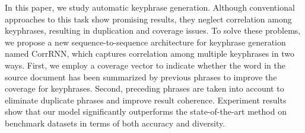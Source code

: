 In this paper, we study automatic keyphrase generation. Although conventional approaches to this task show promising results, they neglect correlation among keyphrases, resulting in duplication and coverage issues. To solve these problems, we propose a new sequence-to-sequence architecture for keyphrase generation named CorrRNN, which captures correlation among multiple keyphrases in two ways. First, we employ a coverage vector to indicate whether the word in the source document has been summarized by previous phrases to improve the coverage for keyphrases. Second, preceding phrases are taken into account to eliminate duplicate phrases and improve result coherence. Experiment results show that our model significantly outperforms the state-of-the-art method on benchmark datasets in terms of both accuracy and diversity.
